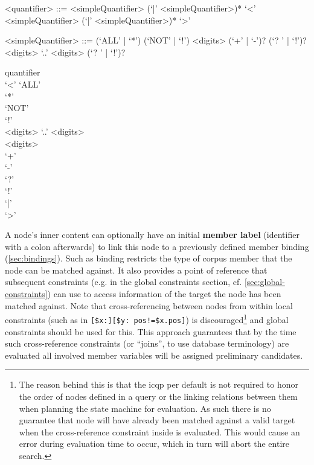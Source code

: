 \documentclass[11pt,a4paper]{report}
\begin{document}
\begin{gram}
	\label{gram:quantifier}
	\begin{grammar}			
		<quantifier> ::= <simpleQuantifier> (`|' <simpleQuantifier>)*
		\alt `\textless' <simpleQuantifier> (`|' <simpleQuantifier>)* `\textgreater'
		
		<simpleQuantifier> ::=  (`ALL' | `*')
		\alt (`NOT' | `!')
		\alt <digits> (`+' | `-')? (`? ' | `!')?
		\alt <digits> `..' <digits> (`? ' | `!')?
	\end{grammar}
	\diagsep	
	\begin{rrdiag*}{quantifier}
		\sst \\ `\textless' \est \srp
		\sst `ALL' \\ `*' \\ `NOT' \\ `!' \\ \sst 
			<digits> `..' <digits> \\ 
			<digits> \sst \\ `+' \\ `-' \est 
			\est \sst \\ `?' \\ `!' \est
		\est
		\\ `|' \erp \sst \\ `\textgreater' \est
	\end{rrdiag*}
\end{gram}

A node's inner content can optionally have an initial \textbf{member label} (identifier with a colon \lit{:} afterwards) to link this node to a previously defined member binding (\ref{sec:bindings}).
Such as binding restricts the type of corpus member that the node can be matched against.
It also provides a point of reference that subsequent constraints (e.g. in the global constraints section, cf. \cref{sec:global-constraints}) can use to access information of the target the node has been matched against.
Note that cross-referencing between nodes from within local constraints (such as in \verb|[$x:][$y: pos!=$x.pos]|) is discouraged\footnote{The reason behind this is that the \ac{icqp} per default is not required to honor the order of nodes defined in a query or the linking relations between them when planning the state machine for evaluation. As such there is no guarantee that node  will have already been matched against a valid target when the cross-reference constraint inside  is evaluated. This would cause an error during evaluation time to occur, which in turn will abort the entire search.} and global constraints should be used for this.
This approach guarantees that by the time such cross-reference constraints (or ``joins'', to use database terminology) are evaluated all involved member variables will be assigned preliminary candidates.
\end{document}
